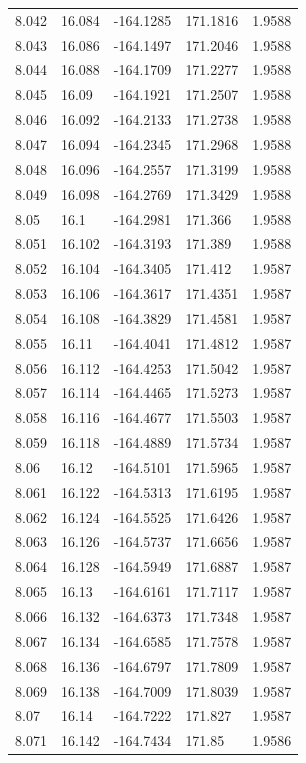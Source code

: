 \begin{tabular}{lllll}
8.042 & 16.084 & -164.1285 & 171.1816 & 1.9588 \\
8.043 & 16.086 & -164.1497 & 171.2046 & 1.9588 \\
8.044 & 16.088 & -164.1709 & 171.2277 & 1.9588 \\
8.045 & 16.09 & -164.1921 & 171.2507 & 1.9588 \\
8.046 & 16.092 & -164.2133 & 171.2738 & 1.9588 \\
8.047 & 16.094 & -164.2345 & 171.2968 & 1.9588 \\
8.048 & 16.096 & -164.2557 & 171.3199 & 1.9588 \\
8.049 & 16.098 & -164.2769 & 171.3429 & 1.9588 \\
8.05 & 16.1 & -164.2981 & 171.366 & 1.9588 \\
8.051 & 16.102 & -164.3193 & 171.389 & 1.9588 \\
8.052 & 16.104 & -164.3405 & 171.412 & 1.9587 \\
8.053 & 16.106 & -164.3617 & 171.4351 & 1.9587 \\
8.054 & 16.108 & -164.3829 & 171.4581 & 1.9587 \\
8.055 & 16.11 & -164.4041 & 171.4812 & 1.9587 \\
8.056 & 16.112 & -164.4253 & 171.5042 & 1.9587 \\
8.057 & 16.114 & -164.4465 & 171.5273 & 1.9587 \\
8.058 & 16.116 & -164.4677 & 171.5503 & 1.9587 \\
8.059 & 16.118 & -164.4889 & 171.5734 & 1.9587 \\
8.06 & 16.12 & -164.5101 & 171.5965 & 1.9587 \\
8.061 & 16.122 & -164.5313 & 171.6195 & 1.9587 \\
8.062 & 16.124 & -164.5525 & 171.6426 & 1.9587 \\
8.063 & 16.126 & -164.5737 & 171.6656 & 1.9587 \\
8.064 & 16.128 & -164.5949 & 171.6887 & 1.9587 \\
8.065 & 16.13 & -164.6161 & 171.7117 & 1.9587 \\
8.066 & 16.132 & -164.6373 & 171.7348 & 1.9587 \\
8.067 & 16.134 & -164.6585 & 171.7578 & 1.9587 \\
8.068 & 16.136 & -164.6797 & 171.7809 & 1.9587 \\
8.069 & 16.138 & -164.7009 & 171.8039 & 1.9587 \\
8.07 & 16.14 & -164.7222 & 171.827 & 1.9587 \\
8.071 & 16.142 & -164.7434 & 171.85 & 1.9586 \\

\end{tabular}

